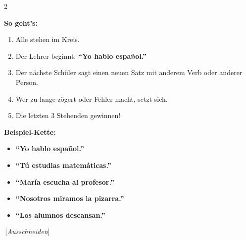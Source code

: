 \documentclass[10pt, a4paper]{article}
\newcommand{\es}[1]{\textbf{#1}}
\begin{document}
\begin{merkbox}

\vspace{2pt}

\begin{multicols}{2}

{\small
\textbf{So geht's:}
\begin{enumerate}[leftmargin=1.5em, itemsep=1pt]
    \item Alle stehen im Kreis.
    \item Der Lehrer beginnt: \es{``Yo hablo español.''}
    \item Der nächste Schüler sagt einen neuen Satz mit anderem Verb oder anderer Person.
    \item Wer zu lange zögert oder Fehler macht, setzt sich.
    \item Die letzten 3 Stehenden gewinnen!
\end{enumerate}}

\columnbreak

{\small
\textbf{Beispiel-Kette:}
\begin{itemize}[leftmargin=1em, itemsep=0pt]
    \item \es{``Yo hablo español.''}
    \item \es{``Tú estudias matemáticas.''}
    \item \es{``María escucha al profesor.''}
    \item \es{``Nosotros miramos la pizarra.''}
    \item \es{``Los alumnos descansan.''}
\end{itemize}}

\end{multicols}
\end{merkbox}


\vspace{6pt}

\noindent\textcolor{mittelgrau}{\dotfill\,[\textit{Ausschneiden}]\,\dotfill}

\vspace{4pt}
\end{document}
